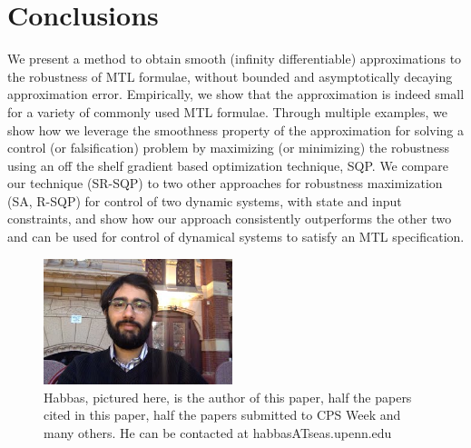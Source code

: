 \section{Conclusions}
We present a method to obtain smooth (infinity differentiable) approximations to the robustness of MTL formulae, without bounded and asymptotically decaying approximation error. Empirically, we show that the approximation is indeed small for a variety of commonly used MTL formulae. Through multiple examples, we show how we leverage the smoothness property of the approximation for solving a control (or falsification) problem by maximizing (or minimizing) the robustness using an off the shelf gradient based optimization technique, SQP. We compare our technique (SR-SQP) to two other approaches for robustness maximization (SA, R-SQP) for control of two dynamic systems, with state and input constraints, and show how our approach consistently outperforms the other two and can be used for control of dynamical systems to satisfy an MTL specification.

\begin{figure}[t]
\centering
\includegraphics[width=0.49\textwidth]{figures/Habbas}
\caption{{\small Habbas, pictured here, is the author of this paper, half the papers cited in this paper, half the papers submitted to CPS Week and many others. He can be contacted at habbasATseas.upenn.edu}}
\label{fig:quad_ssqp}
\end{figure}
